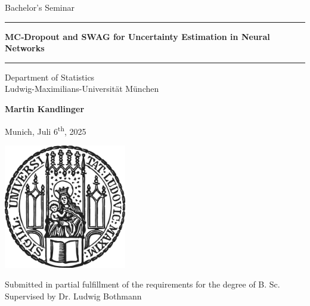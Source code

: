 \documentclass[12pt]{article}
\newcommand{\mytitle}{MC‑Dropout and SWAG for Uncertainty Estimation in Neural Networks}
\newcommand{\myname}{Martin Kandlinger}
\newcommand{\mysupervisor}{Dr. Ludwig Bothmann}
\begin{document}
 
\begin{titlepage}
\begin{center}
    
\LARGE
Bachelor's Seminar
    
\vspace{0.5cm}
      
\rule{\textwidth}{1.5pt}
\LARGE
\textbf{\mytitle}
\rule{\textwidth}{1.5pt}
   
\vspace{0.5cm}
      
\large
Department of Statistics \\
Ludwig-Maximilians-Universität München 

\vfill

\Large
\textbf{\myname}

\vfill

\large
Munich, Juli 6\textsuperscript{th}, 2025
      
\vfill

\includegraphics[width = 0.4\textwidth]{sigillum.png}

\vfill

\normalsize
Submitted in partial fulfillment of the requirements for the degree of B. Sc.
\\
Supervised by \mysupervisor

\end{center}
\end{titlepage}


\newpage
\end{document}
